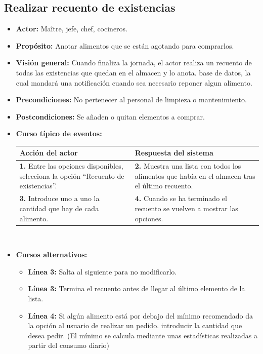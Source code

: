 \documentclass[spanish,a4paper,11pt, twoside]{report}	%
\begin{document}
	\subsection{Realizar recuento de existencias}
			\begin{itemize}
			\item \textbf{Actor:} Maître, jefe, chef, cocineros.
			\item \textbf{Propósito: } Anotar alimentos que se están agotando para comprarlos.
			\item \textbf{Visión general:} Cuando finaliza la jornada, el actor realiza un
				recuento de todas las existencias que quedan en el almacen y lo anota.
				base de datos, la cual mandará una notificación cuando sea necesario reponer
				algun alimento.
			\item \textbf{Precondiciones:} No pertenecer al personal de limpieza o mantenimiento.
			\item \textbf{Postcondiciones:} Se añaden o quitan elementos a comprar.
			\item \textbf{Curso típico de eventos:} 	\\
				\begin{tabular}{|p{6cm}||p{6cm}|}
				\hline
				\textbf{Acción del actor} & \textbf{Respuesta del sistema} \\ \hline
				\textbf{1.} Entre las opciones disponibles, selecciona la opción ``Recuento de existencias''. & 
				\textbf{2.} Muestra una lista con todos los alimentos que había en el almacen tras el último recuento. \\ \hline
				\textbf{3.} Introduce uno a uno la cantidad que hay de cada alimento. & 
				\textbf{4.} Cuando se ha terminado el recuento se vuelven a mostrar las opciones. \\ \hline
			\end{tabular}
			\\
			\item \textbf{Cursos alternativos:} 
			\begin{itemize}
				\item  \textbf{Línea 3:} Salta al siguiente para no
					modificarlo.
				\item  \textbf{Línea 3:} Termina el recuento antes de llegar al último
					elemento de la lista.
				\item  \textbf{Línea 4:} Si algún alimento está por debajo del mínimo
					recomendado da la opción al usuario de realizar un pedido.
					introducir la cantidad que desea pedir. (El mínimo se calcula mediante unas
					estadísticas realizadas a partir del consumo diario)
			\end {itemize}
		\end {itemize}
\end{document}
